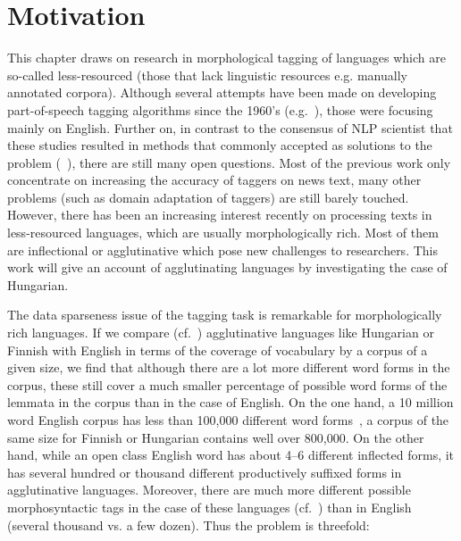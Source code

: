 \section{Motivation}

This chapter draws on research in morphological tagging of languages which are so-called less-resourced (those that lack linguistic resources e.g. manually annotated corpora).
Although several attempts have been made on developing part-of-speech tagging algorithms since the 1960’s (e.g.~\cite{}), those were focusing mainly on English.
Further on, in contrast to the consensus of NLP scientist that these studies resulted in methods that commonly accepted as solutions to the problem (~\cite{}), there are still many open questions.
Most of the previous work only concentrate on increasing the accuracy of taggers on news text, many other problems (such as domain adaptation of taggers) are still barely touched.
However, there has been an increasing interest recently on processing texts in less-resourced languages, which are usually morphologically rich.
Most of them are inflectional or agglutinative which pose new challenges to researchers.
This work will give an account of agglutinating languages by investigating the case of Hungarian.

The data sparseness issue of the tagging task is remarkable for morphologically rich languages.
If we compare (cf.~\cite{Oravecz}) agglutinative languages like Hungarian or Finnish with English in terms of the coverage of vocabulary by a corpus of a given size, we find that although there are a lot more different word forms in the corpus, these still cover a much smaller percentage of possible word forms of the lemmata in the corpus than in the case of English.
On the one hand, a 10 million word English corpus has less than 100,000 different word forms~\cite{}, a corpus of the same size for Finnish or Hungarian contains well over 800,000.
On the other hand, while an open class English word has about 4--6 different inflected forms, it has several hundred or thousand different productively suffixed forms in agglutinative languages.
Moreover, there are much more different possible morphosyntactic tags in the case of these languages (cf.~\cite{}) than in English (several thousand vs. a few dozen).
Thus the problem is threefold:

